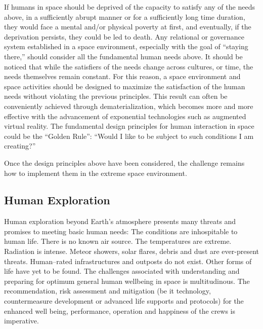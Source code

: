 \documentclass[letter,11pt]{article}
\begin{document}
If humans in space should be deprived of the capacity to satisfy any of the
needs above, in a sufficiently abrupt manner or for a sufficiently long time
duration, they would face a mental and/or physical poverty at first, and
eventually, if the deprivation persists, they could be led to death. Any
relational or governance system established in a space environment, especially
with the goal of ``staying there,'' should consider all the fundamental human
needs above. It should be noticed that while the satisfiers of the needs change
across cultures, or time, the needs themselves remain constant. For this
reason, a space environment and space activities should be designed to maximize
the satisfaction of the human needs without violating the previous principles.
This result can often be conveniently achieved through dematerialization, which
becomes more and more effective with the advancement of exponential
technologies such as augmented virtual reality. The fundamental design
principles for human interaction in space could be the ``Golden Rule'': ``Would
I like to be subject to such conditions I am creating?''

Once the design principles above have been considered, the challenge remains
how to implement them in the extreme space environment.

\subsection{Human Exploration}


Human exploration beyond Earth's atmosphere presents many threats and promises
to meeting basic human needs: The conditions are inhospitable to human life.
There is no known air source. The temperatures are extreme. Radiation is
intense. Meteor showers, solar flares, debris and dust are ever-present
threats. Human--rated infrastructures and outposts do not exist. Other forms of
life have yet to be found.  The challenges associated with understanding and
preparing for optimum general human wellbeing in space is multitudinous. The
recommendation, risk assessment and mitigation (be it technology,
countermeasure development or advanced life supports and protocols) for the
enhanced well being, performance, operation and happiness of the crews is
imperative.
\end{document}
